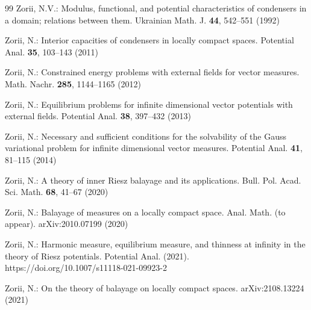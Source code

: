\documentclass[12pt,a4paper,reqno]{amsart} %
\theoremstyle{lause}
\theoremstyle{maaritelma}
\theoremstyle{lause}
\theoremstyle{maaritelma}
\numberwithin{equation}{section}
\begin{document}
\begin{thebibliography}{99}
 Zorii, N.V.: Modulus, functional, and potential characteristics of condensers in a domain; relations between them. Ukrainian Math. J. {\bf 44}, 542--551 (1992)

 Zorii, N.: Interior capacities of condensers in
locally compact spaces. Potential Anal. {\bf 35}, 103--143 (2011)

 Zorii, N.:  Constrained energy problems with external fields for vector measures.  Math. Nachr. {\bf 285}, 1144--1165 (2012)

 Zorii, N.: Equilibrium problems for infinite dimensional vector potentials with
external fields. Potential Anal. {\bf 38}, 397--432 (2013)

 Zorii, N.:  Necessary and sufficient conditions for the solvability of the Gauss
variational problem for infinite dimensional vector measures. Potential Anal.
{\bf 41}, 81--115 (2014)

 Zorii, N.: A theory of inner Riesz balayage and its applications. Bull. Pol. Acad. Sci. Math. {\bf 68}, 41--67 (2020)

 Zorii, N.: Balayage of measures on a locally compact space.
Anal. Math. (to appear).
arXiv:2010.07199 (2020)

 Zorii, N.: Harmonic measure, equilibrium measure, and thinness at infinity in the theory of Riesz potentials. Potential Anal. (2021). https://doi.org/10.1007/s11118-021-09923-2

 Zorii, N.: On the theory of balayage on locally compact spaces. arXiv:2108.13224 (2021)

\end{thebibliography}
\end{document}
